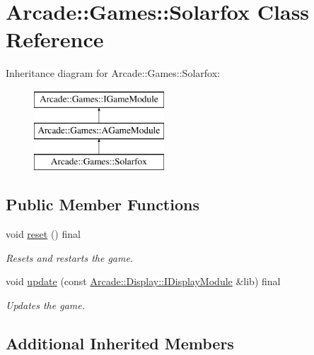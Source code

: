 \hypertarget{classArcade_1_1Games_1_1Solarfox}{}\section{Arcade\+::Games\+::Solarfox Class Reference}
\label{classArcade_1_1Games_1_1Solarfox}
Inheritance diagram for Arcade\+::Games\+::Solarfox\+:\begin{figure}[H]
\begin{center}
\leavevmode
\includegraphics[height=3.000000cm]{classArcade_1_1Games_1_1Solarfox}
\end{center}
\end{figure}
\subsection*{Public Member Functions}
\begin{DoxyCompactItemize}
\item 
\mbox{\label{classArcade_1_1Games_1_1Solarfox_abd44684c20c1590db929f494a55d5576}} 
void \mbox{\hyperlink{classArcade_1_1Games_1_1Solarfox_abd44684c20c1590db929f494a55d5576}{reset}} () final
\begin{DoxyCompactList}\small\item\em Resets and restarts the game. \end{DoxyCompactList}\item 
void \mbox{\hyperlink{classArcade_1_1Games_1_1Solarfox_a87d7898dc7b5d8c658a18c45d35be991}{update}} (const \mbox{\hyperlink{classArcade_1_1Display_1_1IDisplayModule}{Arcade\+::\+Display\+::\+I\+Display\+Module}} \&lib) final
\begin{DoxyCompactList}\small\item\em Updates the game. \end{DoxyCompactList}\end{DoxyCompactItemize}
\subsection*{Additional Inherited Members}


